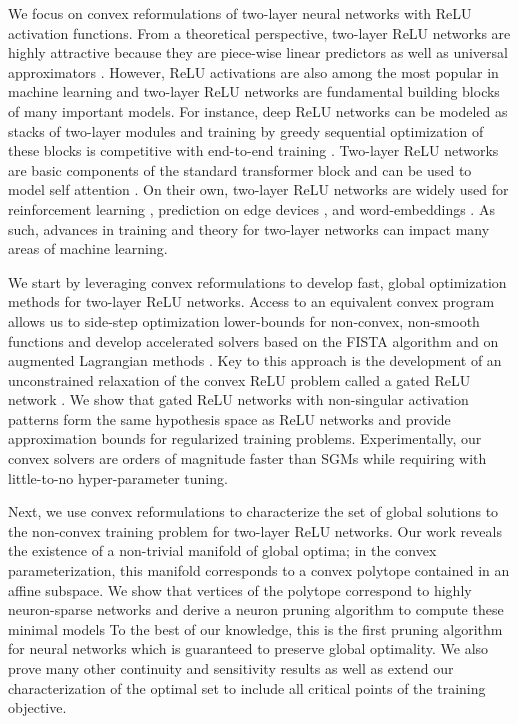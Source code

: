 We focus on convex reformulations of two-layer neural networks with ReLU
activation functions.
From a theoretical perspective, two-layer ReLU networks are highly attractive
because they are piece-wise linear predictors as well as universal
approximators \citep{huang2020universal}.
However, ReLU activations are also among the most popular in machine learning
\citep{szandala2020review} and two-layer ReLU networks are fundamental building
blocks of many important models.
For instance, deep ReLU networks can be modeled as stacks of two-layer modules
and training by greedy sequential optimization of these blocks is competitive
with end-to-end training \citep{belilovsky2019greedy}.
Two-layer ReLU networks are basic components of the standard transformer block
and can be used to model self attention \citep{sahiner2022attention}.
On their own, two-layer ReLU networks are widely used for reinforcement
learning \citep{gaur2023global}, prediction on edge devices
\citep{teerapittayanon2017distributed}, and word-embeddings
\citep{mikolov2013word}.
As such, advances in training and theory for two-layer networks can
impact many areas of machine learning.

We start by leveraging convex reformulations to develop fast, global
optimization methods for two-layer ReLU networks.
Access to an equivalent convex program allows us to side-step optimization
lower-bounds for non-convex, non-smooth functions and develop accelerated
solvers based on the FISTA algorithm \citep{beck2009fista} and on
augmented Lagrangian methods \citep{rockafellar1976augmented}.
Key to this approach is the development of an unconstrained relaxation of the
convex ReLU problem called a gated ReLU network \citep{fiat2019decoupling}.
We show that gated ReLU networks with non-singular activation patterns form the
same hypothesis space as ReLU networks and provide approximation bounds for
regularized training problems.
Experimentally, our convex solvers are orders of magnitude faster than SGMs
while requiring with little-to-no hyper-parameter tuning.

Next, we use convex reformulations to characterize the set of global
solutions to the non-convex training problem for two-layer ReLU networks.
Our work reveals the existence of a non-trivial manifold of global optima;
in the convex parameterization, this manifold corresponds to a convex polytope
contained in an affine subspace.
We show that vertices of the polytope correspond to highly neuron-sparse
networks and derive a neuron pruning algorithm to compute these minimal models
To the best of our knowledge, this is the first pruning algorithm for neural
networks which is guaranteed to preserve global optimality.
We also prove many other continuity and sensitivity results as well as extend
our characterization of the optimal set to include all critical points of the
training objective.

